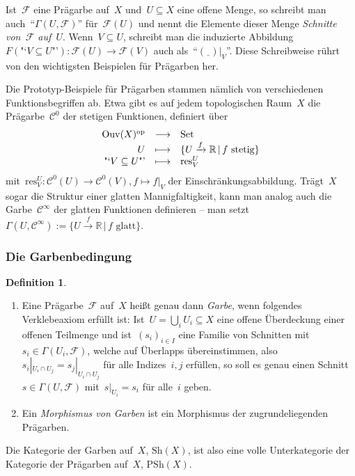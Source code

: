 \documentclass[a4paper,ngerman,12pt]{scrartcl}
\theoremstyle{definition}
\newtheorem{defn}{Definition}[section]
\theoremstyle{plain}
\theoremstyle{remark}
\newcommand{\xra}[1]{\xrightarrow{#1}}
\newcommand{\RR}{\mathbb{R}}
\newcommand{\C}{\mathcal{C}}
\newcommand{\F}{\mathcal{F}}
\newcommand{\Ouv}{\mathrm{Ouv}}
\newcommand{\res}{\mathrm{res}}
\newcommand{\Sh}{\mathrm{Sh}}
\newcommand{\PSh}{\mathrm{PSh}}
\newcommand{\freist}{\underline{\ \ }}
\newcommand{\op}{\mathrm{op}}
\newcommand{\Set}{\mathrm{Set}}
\renewcommand{\_}{\mathpunct{.}\,}
\newcommand{\?}{\,{:}\,}
\begin{document}
Ist~$\F$ eine Prägarbe auf~$X$ und~$U \subseteq X$ eine offene
Menge, so schreibt man auch~"`$\Gamma(U, \F)$"' für~$\F(U)$ und nennt die
Elemente dieser Menge \emph{Schnitte von~$\F$ auf~$U$}. Wenn~$V \subseteq U$,
schreibt man die induzierte Abbildung~$F(\text{"`$V \subseteq U$"'}) : \F(U)
\to \F(V)$ auch als~"`$(\freist)|_V$"'. Diese Schreibweise rührt von den
wichtigsten Beispielen für Prägarben her.

Die Prototyp-Beispiele für Prägarben stammen nämlich von verschiedenen
Funktionsbegriffen ab. Etwa gibt es auf jedem topologischen Raum~$X$ die
Prägarbe~$\C^0$ der stetigen Funktionen, definiert über
\[ \begin{array}{@{}rcl@{}}
  \Ouv(X)^\op &\longrightarrow& \Set \\
  U &\longmapsto& \{ U \xra{f} \RR \,|\, \text{$f$ stetig} \} \\
  \text{"`$V \subseteq U$"'} &\longmapsto& \res^U_V
\end{array} \]
mit~$\res^U_V : \C^0(U) \to \C^0(V), f \mapsto f|_V$ der
Einschränkungsabbildung.  Trägt~$X$ sogar die Struktur einer glatten
Mannigfaltigkeit, kann man analog auch die Garbe~$\C^\infty$ der glatten
Funktionen definieren -- man setzt $\Gamma(U, \C^\infty) := \{ U \xra{f} \RR
\,|\, \text{$f$ glatt} \}$.


\subsubsection*{Die Garbenbedingung}

\begin{defn}\begin{enumerate}
\item Eine Prägarbe~$\F$ auf~$X$ heißt genau dann \emph{Garbe}, wenn
folgendes Verklebeaxiom erfüllt ist: Ist~$U = \bigcup_i U_i \subseteq X$ eine
offene Überdeckung einer offenen Teilmenge und ist~$(s_i)_{i \in I}$ eine
Familie von Schnitten mit~$s_i \in \Gamma(U_i, \F)$, welche auf Überlapps
übereinstimmen, also
$s_i|_{U_i \cap U_j} = s_j|_{U_i \cap U_j}$
für alle Indizes~$i,j$ erfüllen, so soll es genau einen Schnitt~$s \in
\Gamma(U,\F)$ mit~$s|_{U_i} = s_i$ für alle~$i$ geben.
\item Ein \emph{Morphismus von Garben} ist ein Morphismus der zugrundeliegenden
Prägarben.
\end{enumerate}\end{defn}

Die Kategorie der Garben auf~$X$, $\Sh(X)$, ist also eine volle Unterkategorie
der Kategorie der Prägarben auf~$X$, $\PSh(X)$.
\end{document}
